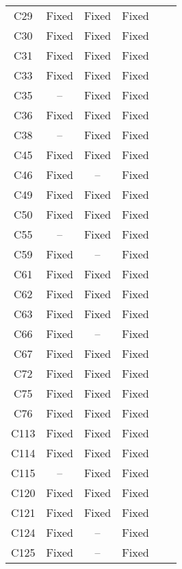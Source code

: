 \begin{table}[!t]
{\begin{tabular}{|c|c|c|c|c|c|}
C29               & Fixed     & Fixed     &Fixed   \\
C30               & Fixed     & Fixed     &Fixed   \\
C31               & Fixed     & Fixed     &Fixed   \\
C33               & Fixed     & Fixed     &Fixed   \\
C35               & --        & Fixed     &Fixed   \\
C36               & Fixed     & Fixed     &Fixed   \\
C38               & --        & Fixed     &Fixed   \\
C45               & Fixed     & Fixed     &Fixed   \\
C46               & Fixed     & --        &Fixed   \\
C49               & Fixed     & Fixed     &Fixed   \\
C50               & Fixed     & Fixed     &Fixed   \\
C55               & --        & Fixed     &Fixed   \\
C59               & Fixed     & --        &Fixed   \\
C61               & Fixed     & Fixed     &Fixed   \\
C62               & Fixed     & Fixed     &Fixed   \\
C63               & Fixed     & Fixed     &Fixed   \\
C66               & Fixed     & --        &Fixed   \\
C67               & Fixed     & Fixed     &Fixed   \\
C72               & Fixed     & Fixed     &Fixed   \\
C75               & Fixed     & Fixed     &Fixed   \\
C76               & Fixed     & Fixed     &Fixed   \\
C113              & Fixed     & Fixed     &Fixed   \\
C114              & Fixed     & Fixed     &Fixed   \\
C115              & --        & Fixed     &Fixed   \\
C120              & Fixed     & Fixed     &Fixed   \\
C121              & Fixed     & Fixed     &Fixed   \\
C124              & Fixed     & --        &Fixed   \\
C125              & Fixed     & --        &Fixed   \\

\end{tabular}}
\end{table}
